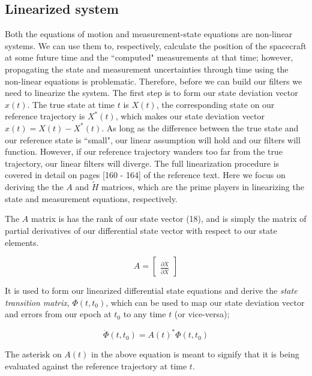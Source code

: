 \documentclass[10pt]{article}
\begin{document}
\subsection{Linearized system}

Both the equations of motion and measurement-state equations are non-linear systems. We can use them to, respectively, calculate the position of the spacecraft at some future time and the ``computed" measurements at that time; however, propagating the state and measurement uncertainties through time using the non-linear equations is problematic. Therefore, before we can build our filters we need to linearize the system. 
The first step is to form our state deviation vector $x(t)$. The true state at time $t$ is $X(t)$, the corresponding state on our reference trajectory is $X^*(t)$, which makes our state deviation vector $x(t) = X(t) - X^*(t)$. As long as the difference between the true state and our reference state is ``small", our linear assumption will hold and our filters will function. However, if our reference trajectory wanders too far from the true trajectory, our linear filters will diverge.
 The full linearization procedure is covered in detail on pages [160 - 164] of the reference text. Here we focus on deriving the  the $A$ and $\tilde{H}$ matrices, which are the prime players in linearizing the state and measurement equations, respectively. 
 
The $A$ matrix is has the rank of our state vector (18), and is simply the matrix of partial derivatives of our differential state vector with respect to our state elements.

\begin{equation}
A  = 
    \begin{bmatrix} 
     \frac{\partial\dot{\bar{X}}}{\partial\bar{X}}      
     \end{bmatrix} 
\end{equation}

It is used to form our linearized differential state equations and derive the \emph{state transition matrix}, $\Phi(t,t_0)$, which can be used to map our state deviation vector and errors from our epoch at $t_0$ to any time $t$ (or vice-versa);

\begin{equation}
\dot{\Phi}(t,t_0)  = A(t)^* \Phi(t,t_0)
\end{equation}

The asterisk on $A(t)$ in the above equation is meant to signify that it is being evaluated against the reference trajectory at time $t$.
\end{document}
